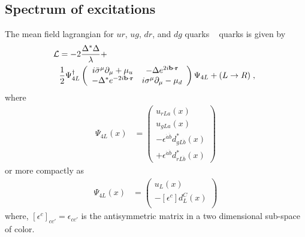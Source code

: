 \documentclass[10pt, aps, prd, superscriptaddress, nofootinbib, 
               amsmath, amssymb, twocolumn,
               preprintnumbers, showpacs,
               raggedbottom,
               floatfix]{revtex4-1}
\newcommand{\dota}{{\dot{a}}}
\newcommand{\dotb}{{\dot{b}}}
\newcommand{\calL}{{\cal{L}}}
\newcommand{\bfr}{{\bf{r}}}
\newcommand{\bfb}{{\bf{b}}}
\begin{document}
\subsection{Spectrum of excitations}
\label{sec:spectrum}
The mean field lagrangian for $ur$, $ug$, $dr$, and $dg$ quarks
~\cite{Rajagopal:2000wf} quarks is given by
\begin{equation}
\begin{split}
{\calL} 
&= 
-2\frac{\Delta^*\Delta}{\lambda}+\\
&\frac{1}{2}\Psi^\dagger_{4L}\left(\begin{array}{cc}
   i\bar{\sigma}^{\mu}\partial_\mu + \mu_u 
   &-\Delta e^{2i\bfb\cdot\bfr}\\
  -\Delta^{*}e^{-2i\bfb\cdot\bfr}&i\sigma^{\mu}\partial_\mu - \mu_d 
  \end{array}
  \right)\Psi_{4L}+(L\rightarrow R)\;,~\label{eq:MFHelicity}
\end{split}
\end{equation}
where
\begin{equation}
\begin{split}
\Psi_{4L}(x) &= \left(
\begin{array}{c} 
  u_{rLa}(x) \\ 
  u_{gLa}(x) \\ 
  -\epsilon^{\dota\dotb}d^*_{gL\dotb}(x)\\ 
  +\epsilon^{\dota\dotb}d^*_{rL\dotb}(x)
\end{array}
\right)
\end{split}
\end{equation}
or more compactly as
\begin{equation}
\begin{split}
\Psi_{4L}(x) &= \left(
\begin{array}{c} 
  u_{L}(x) \\
  -[\epsilon^c]d^C_{L}(x)\\ 
\end{array}
\right)
\end{split}
\end{equation}
where, $[\epsilon^c]_{cc'} = \epsilon_{cc'}$ is the antisymmetric matrix in a two
dimensional sub-space of color.
\end{document}
